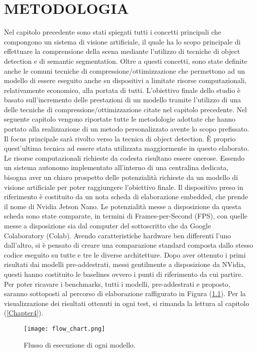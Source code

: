 
\chapter{METODOLOGIA}
\label{Capitolo3}
\thispagestyle{empty}

Nel capitolo precedente sono stati spiegati tutti i concetti principali che 
compongono un sistema di visione artificiale, il quale ha lo scopo principale 
di effettuare la comprensione della scena mediante l'utilizzo di tecniche di 
object detection e di semantic segmentation. Oltre a questi concetti, sono 
state definite anche le comuni tecniche di compressione/ottimizzazione che 
permettono ad un modello di essere eseguito anche su dispositivi a limitate 
risorse computazionali, relativamente economico, alla portata di tutti. 
L'obiettivo finale dello studio è basato sull'incremento delle prestazioni di 
un modello tramite l'utilizzo di una delle tecniche di compressione/ottimizzazione 
citate nel capitolo precedente. Nel seguente capitolo vengono 
riportate tutte le metodologie adottate che hanno portato alla realizzazione 
di un metodo personalizzato avente lo scopo prefissato. Il focus principale 
sarà rivolto verso la tecnica di object detection. È proprio quest'ultima 
tecnica ad essere stata utilizzata maggiormente in questo elaborato. Le
risorse computazionali richieste da codesta risultano essere onerose. Essendo 
un sistema autonomo implementato all'interno di una centralina dedicata, 
bisogna aver un chiaro prospetto delle potenzialità richieste da un modello di 
visione artificiale per poter raggiungere l'obiettivo finale. Il dispositivo preso 
in riferimento è costituito da un nota scheda di elaborazione embedded, che 
prende il nome di Nvidia Jetson Nano. Le potenzialità messe a disposizione 
da questa scheda sono state comparate, in termini di Frames-per-Second 
(FPS), con quelle messe a disposizione sia dal computer del sottoscritto 
che da Google Colaboratory (Colab). Avendo caratteristiche hardware ben 
differenti l'uno dall'altro, si è pensato di creare una comparazione standard 
composta dallo stesso codice eseguito su tutte e tre le diverse architetture. 
Dopo aver ottenuto i primi risultati dai modelli pre-addestrati, messi gentilmente 
a disposizione da NVidia, questi hanno costituito le baselines ovvero 
i punti di riferimento da cui partire. Per poter ricavare i benchmarks, 
tutti i modelli, pre-addestrati e proposto, saranno sottoposti al percorso di 
elaborazione raffigurato in Figura (\ref{flow_chart}). Per la visualizzazione dei risultati 
ottenuti in ogni test, si rimanda la lettura al capitolo (\ref{Chapter4}).
\begin{figure}
    \centering
    \texttt{[image: flow\_chart.png]}
    \centering
    \caption{Flusso di esecuzione di ogni modello.}
    \label{flow_chart}
\end{figure}

